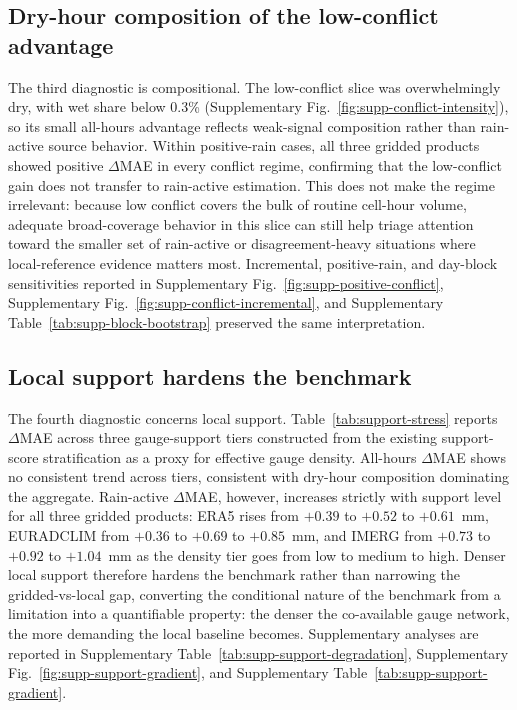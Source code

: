 \documentclass[preprint,12pt]{elsarticle}
\newcommand{\deltamae}{$\Delta$MAE}
\begin{document}
\subsection{Dry-hour composition of the low-conflict advantage}

The third diagnostic is compositional. The low-conflict slice was overwhelmingly dry, with wet share below 0.3\% (Supplementary Fig.~\ref{fig:supp-conflict-intensity}), so its small all-hours advantage reflects weak-signal composition rather than rain-active source behavior. Within positive-rain cases, all three gridded products showed positive \deltamae{} in every conflict regime, confirming that the low-conflict gain does not transfer to rain-active estimation. This does not make the regime irrelevant: because low conflict covers the bulk of routine cell-hour volume, adequate broad-coverage behavior in this slice can still help triage attention toward the smaller set of rain-active or disagreement-heavy situations where local-reference evidence matters most. Incremental, positive-rain, and day-block sensitivities reported in Supplementary Fig.~\ref{fig:supp-positive-conflict}, Supplementary Fig.~\ref{fig:supp-conflict-incremental}, and Supplementary Table~\ref{tab:supp-block-bootstrap} preserved the same interpretation.

\subsection{Local support hardens the benchmark}

The fourth diagnostic concerns local support. Table~\ref{tab:support-stress} reports $\Delta$MAE across three gauge-support tiers constructed from the existing support-score stratification as a proxy for effective gauge density. All-hours $\Delta$MAE shows no consistent trend across tiers, consistent with dry-hour composition dominating the aggregate. Rain-active $\Delta$MAE, however, increases strictly with support level for all three gridded products: ERA5 rises from $+0.39$ to $+0.52$ to $+0.61$~mm, EURADCLIM from $+0.36$ to $+0.69$ to $+0.85$~mm, and IMERG from $+0.73$ to $+0.92$ to $+1.04$~mm as the density tier goes from low to medium to high. Denser local support therefore hardens the benchmark rather than narrowing the gridded-vs-local gap, converting the conditional nature of the benchmark from a limitation into a quantifiable property: the denser the co-available gauge network, the more demanding the local baseline becomes. Supplementary analyses are reported in Supplementary Table~\ref{tab:supp-support-degradation}, Supplementary Fig.~\ref{fig:supp-support-gradient}, and Supplementary Table~\ref{tab:supp-support-gradient}.
\end{document}

